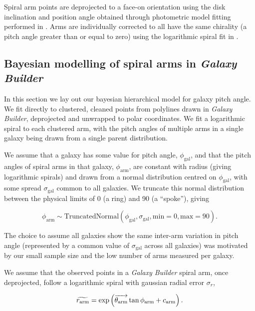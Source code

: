 Spiral arm points are deprojected to a face-on orientation using the disk inclination and position angle obtained through photometric model fitting performed in \Lingard. Arms are individually corrected to all have the same chirality (a pitch angle greater than or equal to zero) using the logarithmic spiral fit in \Lingard.

\subsection{Bayesian modelling of spiral arms in \textit{Galaxy Builder}}

In this section we lay out our bayesian hierarchical model for galaxy pitch angle. We fit directly to clustered, cleaned points from polylines drawn in \textit{Galaxy Builder}, deprojected and unwrapped to polar coordinates. We fit a logarithmic spiral to each clustered arm, with the pitch angles of multiple arms in a single galaxy being drawn from a single parent distribution.

We assume that a galaxy has some value for pitch angle, $\phi_\mathrm{gal}$, and that the pitch angles of spiral arms in that galaxy, $\phi_\mathrm{arm}$, are constant with radius (giving logarithmic spirals) and drawn from a normal distribution centred on $\phi_\mathrm{gal}$, with some spread $\sigma_\mathrm{gal}$ common to all galaxies. We truncate this normal distribution between the physical limits of {0\degree} (a ring) and {90\degree} (a ``spoke''), giving

\begin{equation}
\phi_\mathrm{arm} \sim \mathrm{TruncatedNormal}(\phi_\mathrm{gal}, \sigma_\mathrm{gal}, \mathrm{min}=0, \mathrm{max}=90).
\end{equation}

The choice to assume all galaxies show the same inter-arm variation in pitch angle (represented by a common value of $\sigma_\mathrm{gal}$ across all galaxies) was motivated by our small sample size and the low number of arms measured per galaxy.

We assume that the observed points in a \textit{Galaxy Builder} spiral arm, once deprojected, follow a logarithmic spiral with gaussian radial error $\sigma_r$,

\begin{equation}
\widetilde{r_\mathrm{arm}} = \exp\left(\overrightarrow{\theta_\mathrm{arm}}\tan\phi_\mathrm{arm} + c_\mathrm{arm}\right).
\end{equation}

